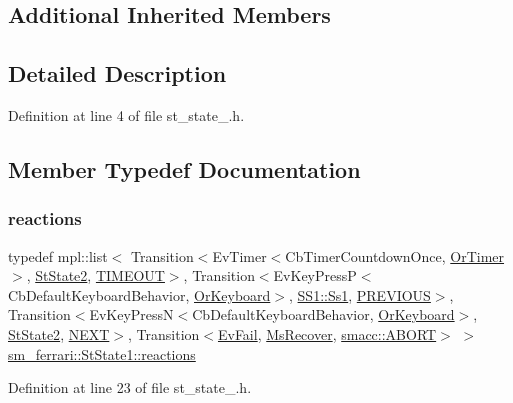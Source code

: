 \subsection*{Additional Inherited Members}


\subsection{Detailed Description}


Definition at line 4 of file st\+\_\+state\+\_.\+h.



\subsection{Member Typedef Documentation}
\mbox{\label{structsm__ferrari_1_1StState1_a45411e9ff7c49926bf5b5235155a523f}} 
\subsubsection{\texorpdfstring{reactions}{reactions}}
{\footnotesize\ttfamily typedef mpl\+::list$<$ Transition$<$Ev\+Timer$<$Cb\+Timer\+Countdown\+Once, \hyperlink{classsm__ferrari_1_1OrTimer}{Or\+Timer}$>$, \hyperlink{structsm__ferrari_1_1StState2}{St\+State2}, \hyperlink{structsm__ferrari_1_1StState1_1_1TIMEOUT}{T\+I\+M\+E\+O\+UT}$>$, Transition$<$Ev\+Key\+PressP$<$Cb\+Default\+Keyboard\+Behavior, \hyperlink{classsm__ferrari_1_1OrKeyboard}{Or\+Keyboard}$>$, \hyperlink{structsm__ferrari_1_1SS1_1_1Ss1}{S\+S1\+::\+Ss1}, \hyperlink{structsm__ferrari_1_1StState1_1_1PREVIOUS}{P\+R\+E\+V\+I\+O\+US}$>$, Transition$<$Ev\+Key\+PressN$<$Cb\+Default\+Keyboard\+Behavior, \hyperlink{classsm__ferrari_1_1OrKeyboard}{Or\+Keyboard}$>$, \hyperlink{structsm__ferrari_1_1StState2}{St\+State2}, \hyperlink{structsm__ferrari_1_1StState1_1_1NEXT}{N\+E\+XT}$>$, Transition$<$\hyperlink{structsm__ferrari_1_1EvFail}{Ev\+Fail}, \hyperlink{classsm__ferrari_1_1MsRecover}{Ms\+Recover}, \hyperlink{structsmacc_1_1default__transition__tags_1_1ABORT}{smacc\+::\+A\+B\+O\+RT}$>$ $>$ \hyperlink{structsm__ferrari_1_1StState1_a45411e9ff7c49926bf5b5235155a523f}{sm\+\_\+ferrari\+::\+St\+State1\+::reactions}}



Definition at line 23 of file st\+\_\+state\+\_.\+h.



